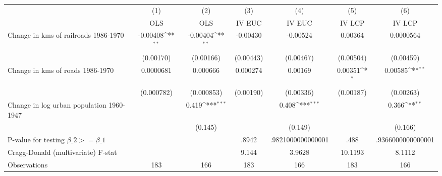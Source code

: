 {
\def\sym#1{\ifmmode^{#1}\else\(^{#1}\)\fi}
\begin{tabular}{l*{6}{c}}
\hline\hline
                &\multicolumn{1}{c}{(1)}&\multicolumn{1}{c}{(2)}&\multicolumn{1}{c}{(3)}&\multicolumn{1}{c}{(4)}&\multicolumn{1}{c}{(5)}&\multicolumn{1}{c}{(6)}\\
                &\multicolumn{1}{c}{OLS}&\multicolumn{1}{c}{OLS}&\multicolumn{1}{c}{IV EUC}&\multicolumn{1}{c}{IV EUC}&\multicolumn{1}{c}{IV LCP}&\multicolumn{1}{c}{IV LCP}\\
\hline
Change in kms of railroads 1986-1970& -0.00408\sym{**} & -0.00404\sym{**} & -0.00430         & -0.00524         &  0.00364         &0.0000564         \\
                &(0.00170)         &(0.00166)         &(0.00443)         &(0.00467)         &(0.00504)         &(0.00459)         \\
[1em]
Change in kms of roads 1986-1970&0.0000681         & 0.000666         & 0.000274         &  0.00169         &  0.00351\sym{*}  &  0.00585\sym{**} \\
                &(0.000782)         &(0.000853)         &(0.00190)         &(0.00336)         &(0.00187)         &(0.00263)         \\
[1em]
Change in log urban population 1960-1947&                  &    0.419\sym{***}&                  &    0.408\sym{***}&                  &    0.366\sym{**} \\
                &                  &  (0.145)         &                  &  (0.149)         &                  &  (0.166)         \\
\hline
P-value for testing $\beta\_{2} >= \beta\_{1}$&                  &                  &    .8942         &.9821000000000001         &     .488         &.9366000000000001         \\
Cragg-Donald (multivariate) F-stat&                  &                  &    9.144         &   3.9628         &  10.1193         &   8.1112         \\
Observations    &      183         &      166         &      183         &      166         &      183         &      166         \\
\hline\hline
\end{tabular}
}
